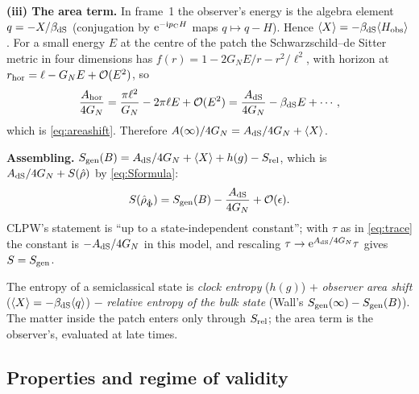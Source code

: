 \textbf{(iii) The area term.} In frame~1 the observer's energy is the algebra element $q=-X/\beta_{\rm dS}$ (conjugation by $\mathrm{e}^{-\mathrm{i} p_{\rm C}H}$ maps $q\mapsto q-H$). Hence $\langle X\rangle=-\beta_{\rm dS}\langle H_{\rm obs}\rangle$. For a small energy $E$ at the centre of the patch the Schwarzschild--de Sitter metric in four dimensions has $f(r)=1-2G_NE/r-r^2/\ell^2$, with horizon at $r_{\rm hor}=\ell-G_NE+\mathcal O(E^2)$, so
\begin{equation}
\frac{A_{\rm hor}}{4G_N}=\frac{\pi\ell^2}{G_N}-2\pi\ell E+\mathcal O(E^2)=\frac{A_{\rm dS}}{4G_N}-\beta_{\rm dS}E+\cdots,
\end{equation}
which is \eqref{eq:areashift}. Therefore $A(\infty)/4G_N=A_{\rm dS}/4G_N+\langle X\rangle$.

\textbf{Assembling.} $S_{\mathrm{gen}}(B)=A_{\rm dS}/4G_N+\langle X\rangle+h(g)-S_{\rm rel}$, which is $A_{\rm dS}/4G_N+S(\hat\rho)$ by \eqref{eq:Sformula}:
\begin{equation}
S(\hat\rho_{\hat\Phi})=S_{\mathrm{gen}}(B)-\frac{A_{\rm dS}}{4G_N}+\mathcal O(\epsilon).\label{eq:main}
\end{equation}
CLPW's statement is ``up to a state-independent constant''; with $\tau$ as in \eqref{eq:trace} the constant is $-A_{\rm dS}/4G_N$ in this model, and rescaling $\tau\to\mathrm{e}^{A_{\rm dS}/4G_N}\tau$ gives $S=S_{\mathrm{gen}}$.

\begin{keyidea}
The entropy of a semiclassical state is \emph{clock entropy} ($h(g)$) $+$ \emph{observer area shift} ($\langle X\rangle=-\beta_{\rm dS}\langle q\rangle$) $-$ \emph{relative entropy of the bulk state} (Wall's $S_{\mathrm{gen}}(\infty)-S_{\mathrm{gen}}(B)$). The matter inside the patch enters only through $S_{\rm rel}$; the area term is the observer's, evaluated at late times.
\end{keyidea}

\subsection{Properties and regime of validity}

